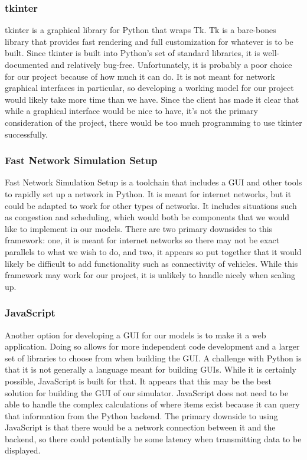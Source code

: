 \documentclass[onecolumn, draftclsnofoot,10pt, compsoc]{IEEEtran}
\begin{document}
\subsubsection{tkinter \cite{tkinter}}
tkinter is a graphical library for Python that wraps Tk.
Tk is a bare-bones library that provides fast rendering and full customization for whatever is to be built.
Since tkinter is built into Python’s set of standard libraries, it is well-documented and relatively bug-free.
Unfortunately, it is probably a poor choice for our project because of how much it can do.
It is not meant for network graphical interfaces in particular, so developing a working model for our project would likely take more time than we have.
Since the client has made it clear that while a graphical interface would be nice to have, it’s not the primary consideration of the project, there would be too much programming to use tkinter successfully.
\subsubsection{Fast Network Simulation Setup \cite{fnss}}
Fast Network Simulation Setup is a toolchain that includes a GUI and other tools to rapidly set up a network in Python.
It is meant for internet networks, but it could be adapted to work for other types of networks.
It includes situations such as congestion and scheduling, which would both be components that we would like to implement in our models.
There are two primary downsides to this framework: one, it is meant for internet networks so there may not be exact parallels to what we wish to do, and two, it appears so put together that it would likely be difficult to add functionality such as connectivity of vehicles.
While this framework may work for our project, it is unlikely to handle nicely when scaling up.
\subsubsection{JavaScript \cite{javascript}}
Another option for developing a GUI for our models is to make it a web application.
Doing so allows for more independent code development and a larger set of libraries to choose from when building the GUI.
A challenge with Python is that it is not generally a language meant for building GUIs.
While it is certainly possible, JavaScript is built for that.
It appears that this may be the best solution for building the GUI of our simulator.
JavaScript does not need to be able to handle the complex calculations of where items exist because it can query that information from the Python backend.
The primary downside to using JavaScript is that there would be a network connection between it and the backend, so there could potentially be some latency when transmitting data to be displayed.
\end{document}
